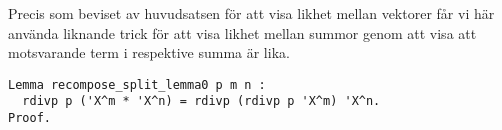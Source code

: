 Precis som beviset av huvudsatsen för att visa likhet mellan vektorer får vi
här använda liknande trick för att visa likhet mellan summor genom att visa att
motsvarande term i respektive summa är lika.
\begin{verbatim}
Lemma recompose_split_lemma0 p m n :
  rdivp p ('X^m * 'X^n) = rdivp (rdivp p 'X^m) 'X^n.
Proof.
\end{verbatim}
